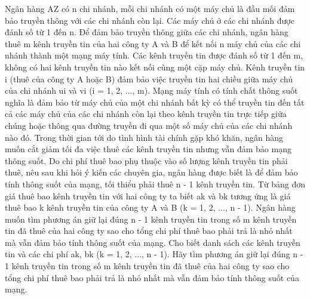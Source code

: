 Ngân hàng AZ có n chi nhánh, mỗi chi nhánh có một máy chủ là đầu mối đảm bảo truyền thông với các chi nhánh còn lại. Các máy chủ ở các chi nhánh được đánh số từ 1 đến n. Để đảm bảo truyền thông giữa các chi nhánh, ngân hàng thuê m kênh truyền tin của hai công ty A và B để kết nối n máy chủ của các chi nhánh thành một mạng máy tính. Các kênh truyền tin được đánh số từ 1 đến m, không có hai kênh truyền tin nào kết nối cùng một cặp máy chủ. Kênh truyền tin i (thuê của công ty A hoặc B) đảm bảo việc truyền tin hai chiều giữa máy chủ của chi nhánh ui và vi (i = 1, 2, ..., m). Mạng máy tính có tính chất thông suốt nghĩa là đảm bảo từ máy chủ của một chi nhánh bất kỳ có thể truyền tin đến tất cả các máy chủ của các chi nhánh còn lại theo kênh truyền tin trực tiếp giữa chúng hoặc thông qua đường truyền đi qua một số máy chủ của các chi nhánh nào đó. Trong thời gian tới do tình hình tài chính gặp khó khăn, ngân hàng muốn cắt giảm tối đa việc thuê các kênh truyền tin nhưng vẫn đảm bảo mạng thông suốt. Do chi phí thuê bao phụ thuộc vào số lượng kênh truyền tin phải thuê, nêu sau khi hỏi ý kiến các chuyên gia, ngân hàng được biết là để đảm bảo tính thông suốt của mạng, tối thiểu phải thuê n - 1 kênh truyền tin. Từ bảng đơn giá thuê bao kênh truyền tin với hai công ty ta biết ak và bk tương ứng là giá thuê bao k kênh truyền tin của công ty A và B (k = 1, 2, ..., n - 1). Ngân hàng muốn tìm phương án giữ lại đúng n - 1 kênh truyền tin trong số m kênh truyền tin đã thuê của hai công ty sao cho tổng chi phí thuê bao phải trả là nhỏ nhất mà vẫn đảm bảo tính thông suốt của mạng.
Cho biết danh sách các kênh truyền tin và các chi phí ak, bk (k = 1, 2, ..., n - 1). Hãy tìm phương án giữ lại đúng n - 1 kênh truyền tin trong số m kênh truyền tin đã thuê của hai công ty sao cho tổng chi phí thuê bao phải trả là nhỏ nhất mà vẫn đảm bảo tính thông suốt của mạng.